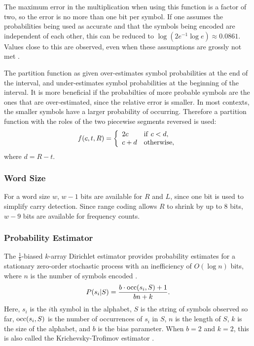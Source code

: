 \documentclass[11pt,letterpaper]{article}
\begin{document}
The maximum error in the multiplication when using this function is a
 factor of two, so the error is no more than one bit per symbol.
If one assumes the probabilities being used as accurate and that the symbols
 being encoded are independent of each other, this can be reduced to
 $\log(2e^{-1}\log e)\approx 0.0861$.
Values close to this are observed, even when these assumptions are grossly not
 met \cite{SM98}.

The partition function as given over-estimates symbol probabilities at the end
 of the interval, and under-estimates symbol probabilities at the beginning of
 the interval.
It is more beneficial if the probabilties of more probable symbols are the ones
 that are over-estimated, since the relative error is smaller.
In most contexts, the smaller symbols have a larger probability of occurring.
Therefore a partition function with the roles of the two piecewise segments
 reversed is used:
\begin{displaymath}
 f(c,t,R)=\left\{
 \begin{array}{ll}2c&{\rm if\ }c<d,\\c+d&{\rm otherwise},\end{array}
 \right.
\end{displaymath}
 where $d=R-t$.
 
\subsubsection{Word Size}

For a word size $w$, $w-1$ bits are available for $R$ and $L$, since one bit is
 used to simplify carry detection.
Since range coding allows $R$ to shrink by up to 8 bits, $w-9$ bits are
 available for frequency counts.

\subsubsection{Probability Estimator}

The $\frac{1}{b}$-biased $k$-array Dirichlet estimator provides probability
 estimates for a stationary zero-order stochastic process with an inefficiency
 of $O(\log n)$ bits, where $n$ is the number of symbols encoded
 \cite{Sht87, STW95}.
\begin{displaymath}
P(s_i|S) = \frac{b\cdot {\rm occ}(s_i,S)+1}{bn+k}.
\end{displaymath}
Here, $s_i$ is the $i$th symbol in the alphabet, $S$ is the string of symbols
 observed so far, ${\rm occ}(s_i,S)$ is the number of occurrences of $s_i$ in
 $S$, $n$ is the length of $S$, $k$ is the size of the alphabet, and $b$ is the
 bias parameter.
When $b=2$ and $k=2$, this is also called the Krichevsky-Trofimov estimator
 \cite{KT81}.
\end{document}
